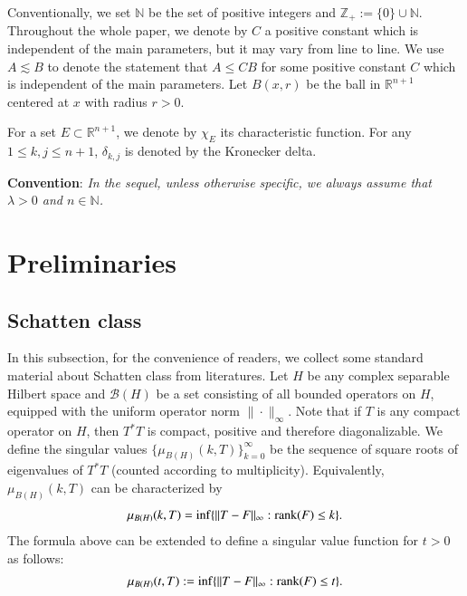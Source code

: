 \documentclass[12pt]{amsart}
\begin{document}
Conventionally, we set $\mathbb{N}$ be the set of positive integers and $\mathbb{Z}_+:=\{0\}\cup\mathbb{N}$. Throughout the whole paper, we denote by $C$ a positive constant which is independent of the main parameters, but it may
vary from line to line. We use $A\lesssim B$ to denote the statement that $A\leq CB$ for some positive constant $C$ which is independent of the main parameters. Let $B(x,r)$ be the ball in $\mathbb{R}^{n+1}$ centered at $x$ with radius $r>0$.

For a set $E \subset \mathbb{R}^{n+1}$, we denote by $\chi_E$ its characteristic function. For any $1\leq k,j\leq n+1$, $\delta_{k,j}$ is denoted by the Kronecker delta.

{\bf Convention}: {\it In the sequel, unless  otherwise specific, we always assume that $\lambda>0$ and $n\in \mathbb{N}$.}
\section{Preliminaries}
\setcounter{equation}{0}
\subsection{Schatten class}\label{Spdef}
In this subsection, for the convenience of readers, we collect some standard material about Schatten class from literatures. Let $H$ be any complex separable Hilbert space and $\mathcal{B}(H)$ be a set consisting of all bounded operators on $H$,  equipped with the uniform operator norm $\|\cdot\|_\infty$.  Note that if $T$ is any compact operator on $H$, then $T^{*}T$ is compact, positive and therefore diagonalizable. We define the singular values $\{\mu_{B(H)}(k,T)\}_{k=0}^{\infty}$ be the sequence of square roots of eigenvalues of $T^{*}T$ (counted according to multiplicity). Equivalently, $\mu_{B(H)}(k,T)$ can be characterized by
\begin{align*}
\mu_{B(H)}(k,T)=\inf\{\|T-F\|_\infty:{\rm rank}(F)\leq k\}.
\end{align*}
The formula above can be extended to define a singular value function for $t>0$ as follows:
\begin{align*}
\mu_{B(H)}(t,T):=\inf\{\|T-F\|_\infty:{\rm rank}(F)\leq t\}.
\end{align*}
\end{document}
